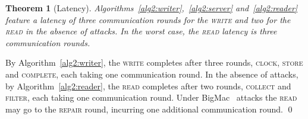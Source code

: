 \documentclass[10pt,conference,compsocconf]{IEEEtran}
\newcommand{\complete}{\textsc{complete}}
\newtheorem{theo}[defn]{Theorem}
\newenvironment{prooff}{\vspace{1ex}\noindent{\bf Proof:}\hspace{0.5em}}
	{\hfill\qed\vspace{1em}}
\begin{document}
\begin{theo}[Latency]
Algorithms~\ref{alg2:writer},~\ref{alg2:server} and~\ref{alg2:reader} feature a latency of \emph{three} communication rounds for the \textsc{write} and \emph{two} for the \textsc{read} in the absence of attacks. In the worst case, the \textsc{read} latency is \emph{three} communication rounds.
\end{theo}
\begin{prooff} By Algorithm~\ref{alg2:writer}, the \textsc{write} completes after three rounds, \textsc{clock}, \textsc{store} and \textsc{\complete}, each taking one communication round. In the absence of attacks, by Algorithm~\ref{alg2:reader}, the \textsc{read} completes after two rounds, \textsc{collect} and \textsc{filter}, each taking one communication round. Under BigMac~\cite{CWADM09} attacks the \textsc{read} may go to the \textsc{repair} round, incurring one additional communication round.
\end{prooff}
\end{document}
